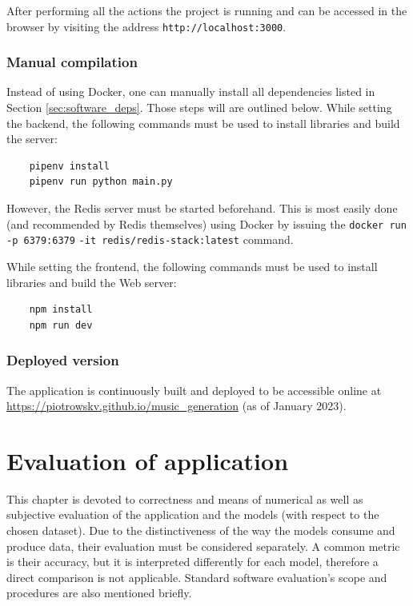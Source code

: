 \documentclass[a4paper, 11pt, twoside]{report}
\theoremstyle{definition}
\begin{document}
After performing all the actions the project is running and can be accessed in the browser by visiting the address \verb|http://localhost:3000|. \par

\subsection{Manual compilation}

Instead of using Docker, one can manually install all dependencies listed in Section \ref{sec:software_deps}. Those steps will are outlined below. While setting the backend, the following commands must be used to install libraries and build the server:

\begin{verbatim}
    pipenv install
    pipenv run python main.py
\end{verbatim} \par

However, the Redis server must be started beforehand. This is most easily done (and recommended by Redis themselves) using Docker by issuing the \verb|docker run -p 6379:6379| \verb|-it redis/redis-stack:latest| command. \par
While setting the frontend, the following commands must be used to install libraries and build the Web server:

\begin{verbatim}
    npm install
    npm run dev
\end{verbatim} \par

\subsection{Deployed version}

The application is continuously built and deployed to be accessible online at \url{https://piotrowskv.github.io/music_generation} (as of January 2023). \par



\chapter{Evaluation of application}

This chapter is devoted to correctness and means of numerical as well as subjective evaluation of the application and the models (with respect to the chosen dataset). Due to the distinctiveness of the way the models consume and produce data, their evaluation must be considered separately. A common metric is their accuracy, but it is interpreted differently for each model, therefore a direct comparison is not applicable. Standard software evaluation's scope and procedures are also mentioned briefly. \par
\end{document}
